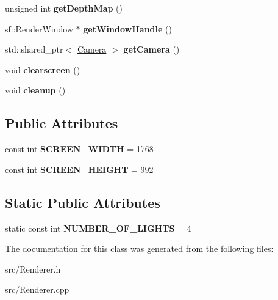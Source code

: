 \begin{DoxyCompactItemize}
unsigned int {\bfseries get\+Depth\+Map} ()
\item 
\mbox{\label{classdarksun_1_1_renderer_aee318e094913bda8adc6c5d5ea426cc3}} 
sf\+::\+Render\+Window $\ast$ {\bfseries get\+Window\+Handle} ()
\item 
\mbox{\label{classdarksun_1_1_renderer_a6e49562a2746a35a876da2f33b88fccd}} 
std\+::shared\+\_\+ptr$<$ \mbox{\hyperlink{classdarksun_1_1_camera}{Camera}} $>$ {\bfseries get\+Camera} ()
\item 
\mbox{\label{classdarksun_1_1_renderer_a93d30fb7a9929ae5fb38bef3da40e4c9}} 
void {\bfseries clearscreen} ()
\item 
\mbox{\label{classdarksun_1_1_renderer_a40b6ff3f5a306181f0ddc04e47462f41}} 
void {\bfseries cleanup} ()
\end{DoxyCompactItemize}
\subsection*{Public Attributes}
\begin{DoxyCompactItemize}
\item 
\mbox{\label{classdarksun_1_1_renderer_a803de6769d1e09bf565272fc8db337c1}} 
const int {\bfseries S\+C\+R\+E\+E\+N\+\_\+\+W\+I\+D\+TH} = 1768
\item 
\mbox{\label{classdarksun_1_1_renderer_a43dbc9664c083388c7031dea1c5dc0b5}} 
const int {\bfseries S\+C\+R\+E\+E\+N\+\_\+\+H\+E\+I\+G\+HT} = 992
\end{DoxyCompactItemize}
\subsection*{Static Public Attributes}
\begin{DoxyCompactItemize}
\item 
\mbox{\label{classdarksun_1_1_renderer_a870e5231bf0216e2ebc3377fb6f5f089}} 
static const int {\bfseries N\+U\+M\+B\+E\+R\+\_\+\+O\+F\+\_\+\+L\+I\+G\+H\+TS} = 4
\end{DoxyCompactItemize}


The documentation for this class was generated from the following files\+:\begin{DoxyCompactItemize}
\item 
src/Renderer.\+h\item 
src/Renderer.\+cpp\end{DoxyCompactItemize}
